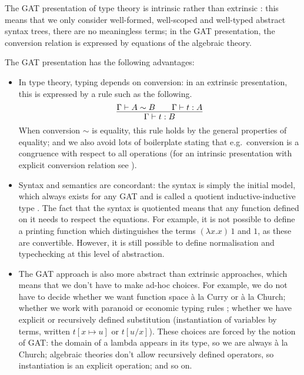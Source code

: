 \documentclass[a4paper,UKenglish,cleveref, autoref, thm-restate]{lipics-v2021}
\begin{document}
The GAT presentation of type theory is intrinsic
\cite{DBLP:conf/csl/AltenkirchR99,DBLP:conf/popl/AltenkirchK16} rather
than extrinsic
\cite{alti:phd93,abel2013normalization,DBLP:conf/cpp/AdjedjLMPP24}:
this means that we only consider well-formed, well-scoped and
well-typed abstract syntax trees, there are no meaningless terms; in
the GAT presentation, the conversion relation is expressed by
equations of the algebraic theory.

The GAT presentation has the following advantages:
\begin{itemize}
\item  In type theory, typing depends on conversion:
  in an extrinsic presentation, this is expressed by a rule such as
  the following.
  \[
  \infer{\Gamma\vdash t : B}{\Gamma\vdash A \sim B && \Gamma\vdash t : A}
  \]
  When conversion $\sim$ is equality, this rule holds by the general
  properties of equality; and we also avoid lots of boilerplate
  stating that e.g.\ conversion is a congruence with respect to all
  operations (for an intrinsic presentation with explicit conversion
  relation see \cite{chapman09eatitself}).
\item Syntax and semantics are concordant: the syntax is simply the
  initial model, which always exists for any GAT and is called a
  quotient inductive-inductive type
  \cite{DBLP:journals/pacmpl/KaposiKA19}. The fact that the syntax is
  quotiented means that any function defined on it needs to respect
  the equations. For example, it is not possible to define a printing
  function which distinguishes the terms $(\lambda x.x)\,1$ and $1$,
  as these are convertible. However, it is still possible to define
  normalisation \cite{lmcs:4005} and typechecking \cite{typecheck} at
  this level of abstraction.
\item The GAT approach is also more abstract than extrinsic
  approaches, which means that we don't have to make ad-hoc
  choices. For example, we do not have to decide whether we want
  function space {\`a} la Curry or {\`a} la Church; whether we work
  with paranoid or economic typing rules \cite[Section
    5]{winterhalter:hal-01626651}; whether we have explicit or
  recursively defined substitution (instantiation of variables by
  terms, written $t[x\mapsto u]$ or $t[u/x]$).  These choices are
  forced by the notion of GAT: the domain of a lambda appears in its
  type, so we are always {\`a} la Church; algebraic theories don't
  allow recursively defined operators, so instantiation is an explicit
  operation; and so on.
\end{itemize}
\end{document}
